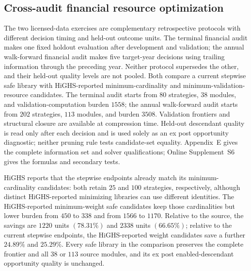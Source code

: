 \subsection{Cross-audit financial resource optimization}
\label{sec:financial-compression-audit}

The two licensed-data exercises are complementary retrospective protocols
with different decision timing and held-out outcome units.  The terminal
financial audit makes one fixed holdout evaluation after development and
validation; the annual walk-forward financial audit makes five target-year
decisions using trailing information through the preceding year.  Neither
protocol supersedes the other, and their held-out quality levels are not
pooled.  Both compare a current stepwise safe library with HiGHS-reported
minimum-cardinality and minimum-validation-resource candidates.  The terminal
audit starts from $80$ strategies, $38$ modules, and validation-computation
burden $1558$; the annual walk-forward audit starts from $202$ strategies,
$113$ modules, and burden $3508$.  Validation frontiers and structural
closure are available at compression time.  Held-out descendant quality is
read only after each decision and is used solely as an ex post opportunity
diagnostic; neither pruning rule tests candidate-set equality.  Appendix~E
gives the complete information set and solver
qualifications; Online Supplement~S6 gives the formulas and secondary tests.

\begin{table}[htbp]
\centering
\scriptsize
\setlength{\tabcolsep}{3.2pt}

\caption{Cross-audit financial resource optimization.  \(|L|\) is a strategy count and
\(W_v\) is measured in prespecified validation-computation units.  ``HiGHS''
means the mixed-integer solver reported \texttt{OPTIMAL}; it does not mean
exact global optimality was established by enumeration.  Selected libraries,
burdens, frontiers, and closures are rechecked exactly.}
\label{tab:financial-resource-compression}
\end{table}

HiGHS reports that the stepwise endpoints already match its minimum-cardinality
candidates: both retain $25$ and $100$ strategies, respectively, although
distinct HiGHS-reported minimizing libraries can use different identities.
The HiGHS-reported minimum-weight safe candidates keep those cardinalities but
lower burden from
$450$ to $338$ and from $1566$ to $1170$.  Relative to the source, the savings
are $1220$ units
$(78.31\%)$ and $2338$ units $(66.65\%)$; relative to the current
stepwise endpoints, the HiGHS-reported weight candidates save a further $24.89\%$
and $25.29\%$.  Every safe library in the comparison preserves the complete
frontier and all $38$ or $113$ source modules, and its ex post
enabled-descendant opportunity quality is unchanged.


